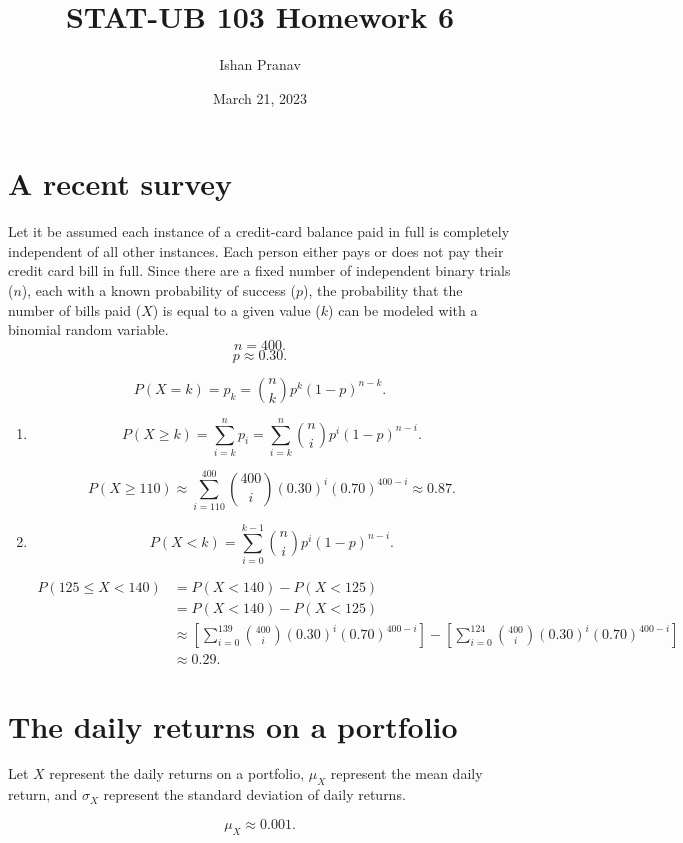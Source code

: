 \documentclass[12pt]{article}
\title{STAT-UB 103 Homework 6}
\author{Ishan Pranav}
\date{March 21, 2023}
\begin{document}
\maketitle
\section{A recent survey}
Let it be assumed each instance of a credit-card balance paid in full is completely independent of all other instances. Each person either pays or does not pay their credit card bill in full. Since there are a fixed number of independent binary trials ($n$), each with a known probability of success ($p$), the probability that the number of bills paid ($X$) is equal to a given value ($k$) can be modeled with a binomial random variable. 
\[n=400.\]
\[p\approx 0.30.\]

\[P(X=k)=p_k={\binom{n}{k}}p^k(1-p)^{n-k}.\]

\begin{enumerate}
\item
\[P(X\geq k)=\sum^{n}_{i=k}{p_i}=\sum^{n}_{i=k}{{\binom{n}{i}}p^i(1-p)^{n-i}}.\]

\[P(X\geq 110)\approx\sum^{400}_{i=110}{{\binom{400}{i}}(0.30)^i(0.70)^{400-i}}\approx 0.87.\]
\item\[P(X<k)=\sum^{k-1}_{i=0}{\binom{n}{i}p^i(1-p)^{n-i}}.\]

\begin{align}
P(125\leq X<140)
&=P(X<140)-P(X<125)\\
&=P(X<140)-P(X<125)\\
&\approx\left[\sum^{139}_{i=0}{\binom{400}{i}(0.30)^i(0.70)^{400-i}}\right]-\left[\sum^{124}_{i=0}{\binom{400}{i}(0.30)^i(0.70)^{400-i}}\right]\\
&\approx 0.29.
\end{align}
\end{enumerate}
\section{The daily returns on a portfolio}
Let $X$ represent the daily returns on a portfolio, $\mu_X$ represent the mean daily return, and $\sigma_X$ represent the standard deviation of daily returns.

\[\mu_X\approx 0.001.\]
\end{document}
